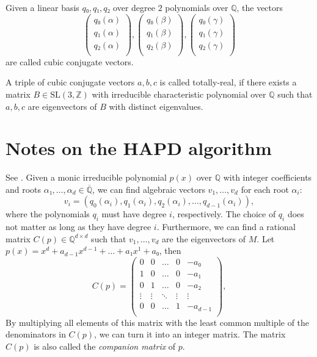 Given a linear basis $q₀, q₁, q₂$ over degree $2$ polynomials over $ℚ$,
the vectors
\[
  \begin{pmatrix}
    q₀(α) \\
    q₁(α) \\
    q₂(α) \\
  \end{pmatrix},
  \begin{pmatrix}
    q₀(β) \\
    q₁(β) \\
    q₂(β) \\
  \end{pmatrix},
  \begin{pmatrix}
    q₀(γ) \\
    q₁(γ) \\
    q₂(γ) \\
  \end{pmatrix}
\]
are called cubic conjugate vectors.

A triple of cubic conjugate vectors $a, b, c$ is called totally-real, if there
exists a matrix $B ∈ \text{SL}(3, ℤ)$ with irreducible characteristic
polynomial over $ℚ$ such that $a, b, c$ are eigenvectors of $B$ with distinct
eigenvalues.

\section{Notes on the HAPD algorithm}

See \cite{Karpenkov2024}.
Given a monic irreducible polynomial $p(x)$ over $ℚ$ with integer coefficients and roots $α₁, \dots, α_d ∈ \overline{ℚ}$,
we can find algebraic vectors $v_1, \dots, v_d$ for each root $α_i$:
\[
  v_i = (q_0(α_i), q_1(α_i), q_2(α_i), \dots, q_{d-1}(α_i)),
\]
where the polynomials $q_i$ must have degree $i$, respectively.
The choice of $q_i$ does not matter as long as they have degree $i$.
Furthermore, we can find a rational matrix $C(p) ∈ ℚ^{d × d}$ such that $v_1, \dots, v_d$ are the eigenvectors of $M$.
Let $p(x) = x^d + a_{d-1} x^{d-1} + \dots + a₁ x^1 + a₀$, then
\[
  C(p) =
  \begin{pmatrix}
    0 & 0 & \dots & 0 & -a₀ \\
    1 & 0 & \dots & 0 & -a₁ \\
    0 & 1 & \dots & 0 & -a₂ \\
    \vdots & \vdots & \ddots & \vdots & \vdots \\
    0 & 0 & \dots & 1 & -a_{d-1} \\
  \end{pmatrix},
\]
By multiplying all elements of this matrix with the least common multiple of the denominators in $C(p)$,
we can turn it into an integer matrix.
The matrix $C(p)$ is also called the \emph{companion matrix} of $p$.

